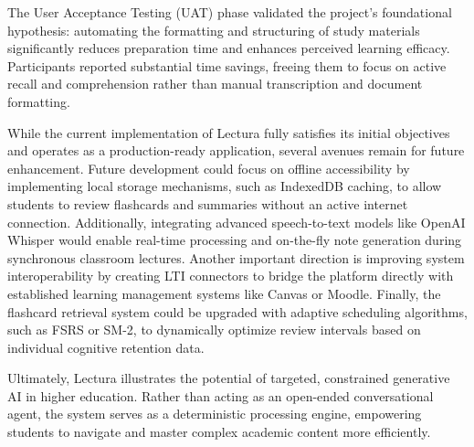 The User Acceptance Testing (UAT) phase validated the project's foundational hypothesis: automating the formatting and structuring of study materials significantly reduces preparation time and enhances perceived learning efficacy. Participants reported substantial time savings, freeing them to focus on active recall and comprehension rather than manual transcription and document formatting.

While the current implementation of Lectura fully satisfies its initial objectives and operates as a production-ready application, several avenues remain for future enhancement. Future development could focus on offline accessibility by implementing local storage mechanisms, such as IndexedDB caching, to allow students to review flashcards and summaries without an active internet connection. Additionally, integrating advanced speech-to-text models like OpenAI Whisper would enable real-time processing and on-the-fly note generation during synchronous classroom lectures. Another important direction is improving system interoperability by creating LTI connectors to bridge the platform directly with established learning management systems like Canvas or Moodle. Finally, the flashcard retrieval system could be upgraded with adaptive scheduling algorithms, such as FSRS or SM-2, to dynamically optimize review intervals based on individual cognitive retention data.

Ultimately, Lectura illustrates the potential of targeted, constrained generative AI in higher education. Rather than acting as an open-ended conversational agent, the system serves as a deterministic processing engine, empowering students to navigate and master complex academic content more efficiently.
